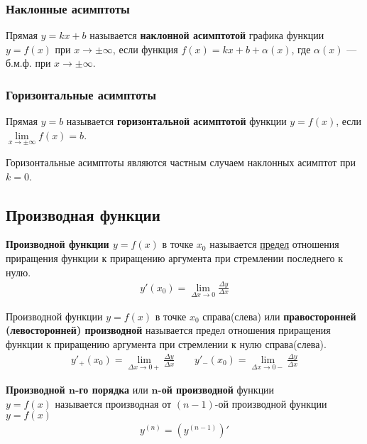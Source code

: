 \subsubsection{Наклонные асимптоты}
\begin{definition}
	Прямая $y=kx+b$ называется \textbf{наклонной асимптотой} графика функции $y=f(x)$ при $x \to \pm \infty$, если функция $f(x) = kx+b + \alpha(x)$, где $\alpha(x)$ --- б.м.ф. при $x\to \pm \infty$.
\end{definition}
\subsubsection{Горизонтальные асимптоты}
\begin{definition}
	Прямая $y=b$ называется \textbf{горизонтальной асимптотой} функции $y=f(x)$, если $\lim\limits_{x \to \pm \infty} f(x) = b$.
\end{definition}
\begin{corollary*}
	Горизонтальные асимптоты являются частным случаем наклонных асимптот при $k=0$.
\end{corollary*}

\subsection{Производная функции}

\begin{definition}
  \textbf{Производной функции $y = f(x)$} в точке $x_0$ называется \underline{предел} отношения приращения функции к приращению аргумента при стремлении последнего к нулю.
  \begin{align*}
    \boxed{y'(x_0) = \lim\limits_{\Delta x \to 0} \frac{\Delta y}{\Delta x}}
  \end{align*}
\end{definition}
\begin{definition}
  Производной функции $y=f(x)$ в точке $x_0$ справа(слева) или \textbf{правосторонней (левосторонней) производной} называется предел отношения приращения функции к приращению аргумента при стремлении к нулю справа(слева).
  \begin{gather*}
    \boxed{y'_+(x_0) = \lim\limits_{\Delta x \to 0+} \frac{\Delta y}{\Delta x}} \qquad \boxed{y'_-(x_0) = \lim\limits_{\Delta x \to 0-} \frac{\Delta y}{\Delta x}}
  \end{gather*}
\end{definition}
\begin{definition}
\textbf{Производной $\bm{n}$-го порядка} или \textbf{$\bm{n}$-ой производной} функции \\ $y=f(x)$ называется производная от $(n-1)$-ой производной функции $y=f(x)$
\begin{align*}
\boxed{y^{(n)} = \left( y^{(n-1)} \right)'}
\end{align*}
\end{definition}

